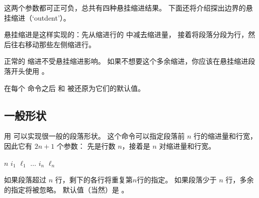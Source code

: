 \documentclass{book}
\begin{document}
这两个参数都可正可负，总共有四种悬挂缩进结果。
下面还将介绍探出边界的悬挂缩进（`outdent'）。

悬挂缩进是这样实现的：先从缩进行的  中减去缩进量，
接着将段落分段为行，然后往右移动那些左侧缩进行。

正常的  缩进不受悬挂缩进影响。
如果不想要这个多余缩进，你应该在悬挂缩进段落开头使用 。

在每个  命令之后  和  被还原为它们的默认值。


\subsection{一般形状}

用  可以实现很一般的段落形状。
这个命令可以指定段落前 $n$ 行的缩进量和行宽，因此它有 $2n+1$ 个参数：
先是行数 $n$，接着是 $n$ 对缩进量和行宽。
\begin{disp} 
    $n$ $i_1$ $\ell_1$ $\ldots$ $i_n$ $\ell_n$\end{disp}
如果段落超过 $n$ 行，剩下的各行将重复第$n$行的指定。
如果段落少于 $n$ 行，多余的指定将被忽略。
默认值（当然）是 。
\end{document}
